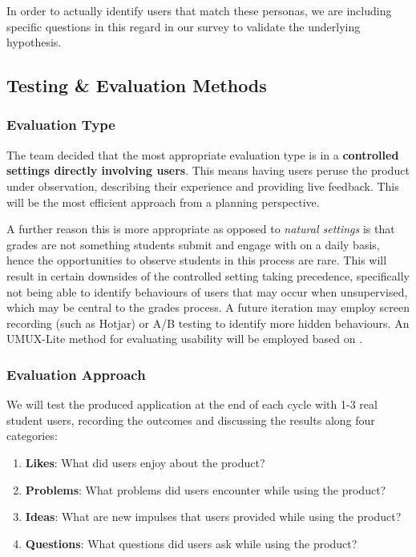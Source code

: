 In order to actually identify users that match these personas, we are including specific questions in this regard in our survey to validate the underlying hypothesis.

\subsection{Testing \& Evaluation Methods}

\subsubsection{Evaluation Type}
The team decided that the most appropriate evaluation type is in a \textbf{controlled settings directly involving users}. This means having users peruse the product under observation, describing their experience and providing live feedback. This will be the most efficient approach from a planning perspective.

A further reason this is more appropriate as opposed to \textit{natural settings} is that grades are not something students submit and engage with on a daily basis, hence the opportunities to observe students in this process are rare. This will result in certain downsides of the controlled setting taking precedence, specifically not being able to identify behaviours of users that may occur when unsupervised, which may be central to the grades process. A future iteration may employ screen recording (such as Hotjar) or A/B testing to identify more hidden behaviours. An UMUX-Lite method for evaluating usability will be employed based on \cite{lewis}.

\subsubsection{Evaluation Approach}

We will test the produced application at the end of each cycle with 1-3 real student users, recording the outcomes and discussing the results along four categories:

\begin{enumerate}
    \item \textbf{Likes}: What did users enjoy about the product?
    \item \textbf{Problems}: What problems did users encounter while using the product?
    \item \textbf{Ideas}: What are new impulses that users provided while using the product?
     \item \textbf{Questions}: What questions did users ask while using the product?
\end{enumerate}

